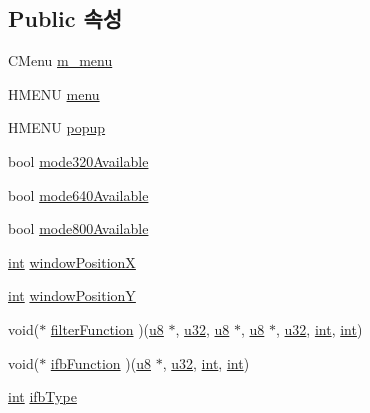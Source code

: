 \subsection*{Public 속성}
\begin{DoxyCompactItemize}
\item 
C\+Menu \mbox{\hyperlink{class_v_b_a_a7f2defb31b3597bac8b7e372b2b12fba}{m\+\_\+menu}}
\item 
H\+M\+E\+NU \mbox{\hyperlink{class_v_b_a_acf9d855b5b959a2df9c6cb21b888366e}{menu}}
\item 
H\+M\+E\+NU \mbox{\hyperlink{class_v_b_a_ae9de0b5d432ad2e8a21faf040182fe03}{popup}}
\item 
bool \mbox{\hyperlink{class_v_b_a_adcefc742bdb15ddb902bcb2df896d298}{mode320\+Available}}
\item 
bool \mbox{\hyperlink{class_v_b_a_adc44d61208b927bde7ea49c25a2e30bc}{mode640\+Available}}
\item 
bool \mbox{\hyperlink{class_v_b_a_a3e2e940c6531daba73473c51a9916574}{mode800\+Available}}
\item 
\mbox{\hyperlink{_util_8cpp_a0ef32aa8672df19503a49fab2d0c8071}{int}} \mbox{\hyperlink{class_v_b_a_a5f9fb2744603deedbe9f8a77a7a2cf91}{window\+PositionX}}
\item 
\mbox{\hyperlink{_util_8cpp_a0ef32aa8672df19503a49fab2d0c8071}{int}} \mbox{\hyperlink{class_v_b_a_a79b40ebb7ccfd4390eb0747168d07cad}{window\+PositionY}}
\item 
void($\ast$ \mbox{\hyperlink{class_v_b_a_a8267ca41247e8d752776b57a3f8af011}{filter\+Function}} )(\mbox{\hyperlink{_system_8h_aed742c436da53c1080638ce6ef7d13de}{u8}} $\ast$, \mbox{\hyperlink{_system_8h_a10e94b422ef0c20dcdec20d31a1f5049}{u32}}, \mbox{\hyperlink{_system_8h_aed742c436da53c1080638ce6ef7d13de}{u8}} $\ast$, \mbox{\hyperlink{_system_8h_aed742c436da53c1080638ce6ef7d13de}{u8}} $\ast$, \mbox{\hyperlink{_system_8h_a10e94b422ef0c20dcdec20d31a1f5049}{u32}}, \mbox{\hyperlink{_util_8cpp_a0ef32aa8672df19503a49fab2d0c8071}{int}}, \mbox{\hyperlink{_util_8cpp_a0ef32aa8672df19503a49fab2d0c8071}{int}})
\item 
void($\ast$ \mbox{\hyperlink{class_v_b_a_af044c0f19b7118a5cc01cf25e059145e}{ifb\+Function}} )(\mbox{\hyperlink{_system_8h_aed742c436da53c1080638ce6ef7d13de}{u8}} $\ast$, \mbox{\hyperlink{_system_8h_a10e94b422ef0c20dcdec20d31a1f5049}{u32}}, \mbox{\hyperlink{_util_8cpp_a0ef32aa8672df19503a49fab2d0c8071}{int}}, \mbox{\hyperlink{_util_8cpp_a0ef32aa8672df19503a49fab2d0c8071}{int}})
\item 
\mbox{\hyperlink{_util_8cpp_a0ef32aa8672df19503a49fab2d0c8071}{int}} \mbox{\hyperlink{class_v_b_a_a4349741c5cec8852f8914093484418e8}{ifb\+Type}}

\end{DoxyCompactItemize}
